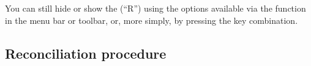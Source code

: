 You can still hide or show the  (\enquote{R}) using the options available via the  function in the menu bar or toolbar, or, more simply, by pressing the  key combination.


\subsection{Reconciliation procedure\label{reconciliation-account-howto}}

